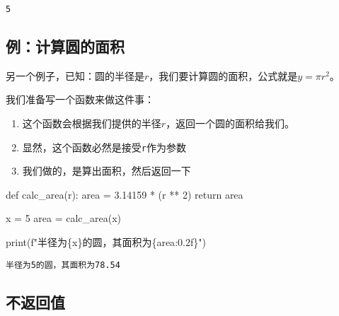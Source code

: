 \documentclass[
  letterpaper,
  DIV=11,
  numbers=noendperiod]{scrreprt}
\newenvironment{Shaded}{\begin{snugshade}}{\end{snugshade}}
\newcommand{\BuiltInTok}[1]{\textcolor[rgb]{0.00,0.23,0.31}{#1}}
\newcommand{\ControlFlowTok}[1]{\textcolor[rgb]{0.00,0.23,0.31}{#1}}
\newcommand{\DecValTok}[1]{\textcolor[rgb]{0.68,0.00,0.00}{#1}}
\newcommand{\FloatTok}[1]{\textcolor[rgb]{0.68,0.00,0.00}{#1}}
\newcommand{\KeywordTok}[1]{\textcolor[rgb]{0.00,0.23,0.31}{#1}}
\newcommand{\NormalTok}[1]{\textcolor[rgb]{0.00,0.23,0.31}{#1}}
\newcommand{\OperatorTok}[1]{\textcolor[rgb]{0.37,0.37,0.37}{#1}}
\newcommand{\SpecialCharTok}[1]{\textcolor[rgb]{0.37,0.37,0.37}{#1}}
\newcommand{\SpecialStringTok}[1]{\textcolor[rgb]{0.13,0.47,0.30}{#1}}
\providecommand{\tightlist}{%
  \setlength{\itemsep}{0pt}\setlength{\parskip}{0pt}}\usepackage{longtable,booktabs,array}
\begin{document}
\begin{verbatim}
5
\end{verbatim}

\hypertarget{ux4f8bux8ba1ux7b97ux5706ux7684ux9762ux79ef}{%
\subsection{例：计算圆的面积}\label{ux4f8bux8ba1ux7b97ux5706ux7684ux9762ux79ef}}

另一个例子，已知：圆的半径是\(r\)，我们要计算圆的面积，公式就是\(y = \pi r^2\)。

我们准备写一个函数来做这件事：

\begin{enumerate}
\def\labelenumi{\arabic{enumi}.}
\tightlist
\item
  这个函数会根据我们提供的半径\(r\)，返回一个圆的面积给我们。
\item
  显然，这个函数必然是接受\texttt{r}作为参数
\item
  我们做的，是算出面积，然后返回一下
\end{enumerate}

\begin{Shaded}
\begin{Highlighting}[]
\KeywordTok{def}\NormalTok{ calc\_area(r): }
\NormalTok{    area }\OperatorTok{=} \FloatTok{3.14159} \OperatorTok{*}\NormalTok{ (r }\OperatorTok{**} \DecValTok{2}\NormalTok{) }
    \ControlFlowTok{return}\NormalTok{ area}
\end{Highlighting}
\end{Shaded}

\begin{Shaded}
\begin{Highlighting}[]
\NormalTok{x }\OperatorTok{=} \DecValTok{5} 
\NormalTok{area }\OperatorTok{=}\NormalTok{ calc\_area(x)}

\BuiltInTok{print}\NormalTok{(}\SpecialStringTok{f"半径为}\SpecialCharTok{\{}\NormalTok{x}\SpecialCharTok{\}}\SpecialStringTok{的圆，其面积为}\SpecialCharTok{\{}\NormalTok{area}\SpecialCharTok{:0.2f\}}\SpecialStringTok{"}\NormalTok{)}
\end{Highlighting}
\end{Shaded}

\begin{verbatim}
半径为5的圆，其面积为78.54
\end{verbatim}

\hypertarget{ux4e0dux8fd4ux56deux503c}{%
\subsection{不返回值}\label{ux4e0dux8fd4ux56deux503c}}
\end{document}
